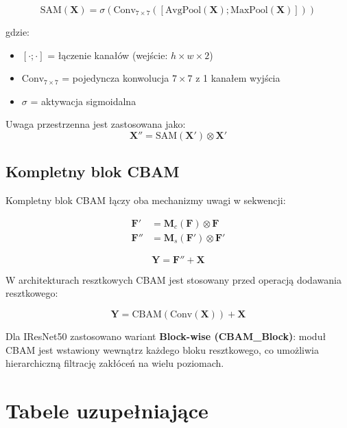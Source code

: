 \begin{equation}
\text{SAM}(\mathbf{X}) = \sigma(\text{Conv}_{7 \times 7}([\text{AvgPool}(\mathbf{X}); \text{MaxPool}(\mathbf{X})]))
\end{equation}

gdzie:
\begin{itemize}
    \item $[\cdot; \cdot]$ = łączenie kanałów (wejście: $h \times w \times 2$)
    \item $\text{Conv}_{7 \times 7}$ = pojedyncza konwolucja $7 \times 7$ z 1 kanałem wyjścia
    \item $\sigma$ = aktywacja sigmoidalna
\end{itemize}

Uwaga przestrzenna jest zastosowana jako:
\begin{equation}
\mathbf{X}'' = \text{SAM}(\mathbf{X}') \otimes \mathbf{X}'
\end{equation}

\subsection{Kompletny blok CBAM}
Kompletny blok CBAM łączy oba mechanizmy uwagi w sekwencji:

\begin{equation}
\begin{split}
    \mathbf{F}' &= \mathbf{M}_c(\mathbf{F}) \otimes \mathbf{F} \\
    \mathbf{F}'' &= \mathbf{M}_s(\mathbf{F}') \otimes \mathbf{F}'
\end{split}
\end{equation}

\begin{equation}
\mathbf{Y} = \mathbf{F}'' + \mathbf{X}
\end{equation}

W architekturach resztkowych CBAM jest stosowany przed operacją dodawania resztkowego:

\begin{equation}
\mathbf{Y} = \text{CBAM}(\text{Conv}(\mathbf{X})) + \mathbf{X}
\end{equation}

Dla IResNet50 zastosowano wariant \textbf{Block-wise (CBAM\_Block)}: moduł CBAM jest wstawiony wewnątrz każdego bloku resztkowego, co umożliwia hierarchiczną filtrację zakłóceń na wielu poziomach.

\section{Tabele uzupełniające}
\label{app:tables}

